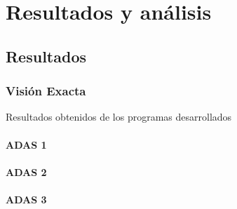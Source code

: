 \chapter{Resultados y análisis}

\begin{comment}
En tesis formales en este capítulo se exponen los diseños experimentales
realizados para comprobar el funcionamiento correcto del sistema. Por ejemplo,
si se realiza algún sistema con reconocimiento de patrones, usualmente esta
sección involucra las llamadas \emph{matrices de confusión} donde se compactan
las estadísticas de reconocimiento alcanzadas. En circuitos de hardware,
experimentos para determinar variaciones contra ruido, etc. También pueden
ilustrarse algunos resultados concretos como ejemplo del funcionamiento de los
algoritmos. Puede mostrar por medio de experimentos ventajas, desventajas,
desempeño de su algoritmo, o comparaciones con otros algoritmos.

Recuerde que debe minimizar los ``saltos'' que el lector deba hacer en su
documento. Por tanto, usualmente el análisis se coloca junto a tablas y figuras
presentadas, y debe tener un orden de tal modo que se observe cómo los
objetivos específicos y el objetivo general del proyecto se han cumplido.
\end{comment}


\section{Resultados}

\subsection{Visión Exacta}

Resultados obtenidos de los programas desarrollados 

\subsubsection{ADAS 1}

\subsubsection{ADAS 2}

\subsubsection{ADAS 3}


